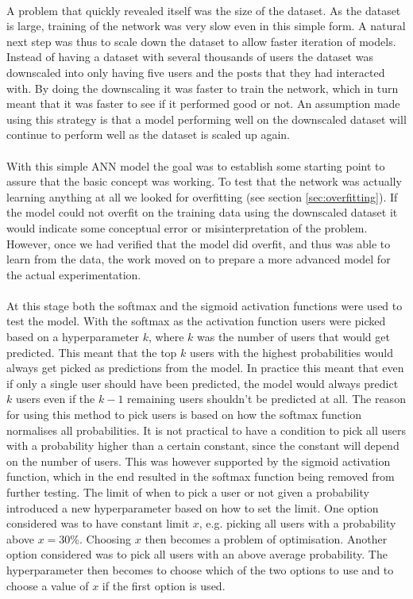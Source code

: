 \\
A problem that quickly revealed itself was the size of the dataset. As the dataset is large, training of the network was very slow even in this simple form. A natural next step was thus to scale down the dataset to allow faster iteration of models. Instead of having a dataset with several thousands of users the dataset was downscaled into only having five users and the posts that they had interacted with. By doing the downscaling it was faster to train the network, which in turn meant that it was faster to see if it performed good or not. An assumption made using this strategy is that a model performing well on the downscaled dataset will continue to perform well as the dataset is scaled up again. 
\\\\
With this simple ANN model the goal was to establish some starting point to assure that the basic concept was working. To test that the network was actually learning anything at all we looked for overfitting (see section \ref{sec:overfitting}). If the model could not overfit on the training data using the downscaled dataset it would indicate some conceptual error or misinterpretation of the problem. However, once we had verified that the model did overfit, and thus was able to learn from the data, the work moved on to prepare a more advanced model for the actual experimentation.
\\\\
At this stage both the softmax and the sigmoid activation functions were used to test the model. With the softmax as the activation function users were picked based on a hyperparameter $k$, where $k$ was the number of users that would get predicted. This meant that the top $k$ users with the highest probabilities would always get picked as predictions from the model. In practice this meant that even if only a single user should have been predicted, the model would always predict $k$ users even if the $k-1$ remaining users shouldn't be predicted at all. The reason for using this method to pick users is based on how the softmax function normalises all probabilities. It is not practical to have a condition to pick all users with a probability higher than a certain constant, since the constant will depend on the number of users. This was however supported by the sigmoid activation function, which in the end resulted in the softmax function being removed from further testing. The limit of when to pick a user or not given a probability introduced a new hyperparameter based on how to set the limit. One option considered was to have constant limit $x$, e.g. picking all users with a probability above $x=30\%$. Choosing $x$ then becomes a problem of optimisation. Another option considered was to pick all users with an above average probability. The hyperparameter then becomes to choose which of the two options to use and to choose a value of $x$ if the first option is used.
